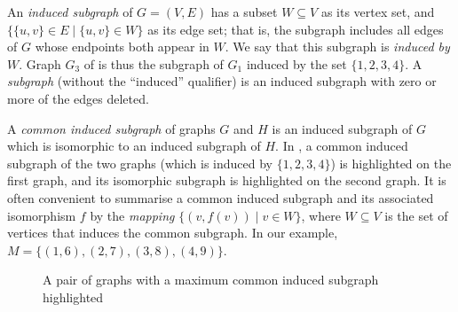 An \emph{induced subgraph} of $G = (V, E)$ has a subset $W \subseteq V$ as its
vertex set, and $\{\{u, v\} \in E \mid \{u, v\} \in W\}$ as its edge set; that
is, the subgraph includes all edges of $G$ whose endpoints both appear in
$W$.  We say that this subgraph is \emph{induced by} $W$.
Graph $G_3$ of  is thus the subgraph
of $G_1$ induced by the set $\{1,2,3,4\}$.
A \emph{subgraph} (without the ``induced'' qualifier) is an induced subgraph
with zero or more of the edges deleted.

A \emph{common induced subgraph} of graphs $G$ and $H$ is an induced subgraph
of $G$ which is isomorphic to an induced subgraph of $H$. In
, a common induced subgraph of the two graphs (which is
induced by $\{1,2,3,4\}$) is highlighted on the first graph, and its isomorphic
subgraph is highlighted on the second graph.  It is often convenient to summarise
a common induced subgraph and its associated isomorphism $f$ by the \emph{mapping}
$\{(v,f(v)) \mid v \in W\}$, where $W \subseteq V$ is the set of vertices that
induces the common subgraph.  In our example, $M = \{(1,6), (2,7), (3,8), (4,9)\}$.

\begin{figure}[h!]
\centering
{}
\qquad
{}
\caption{A pair of graphs with a maximum common induced subgraph highlighted}
\label{fig:cis-example}
\end{figure}

